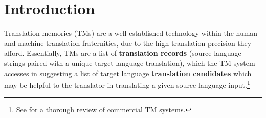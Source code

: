 


\newcommand{\ul}{}








\newcommand{\tabref}[1]{}
\newcommand{\secref}[1]{}

\newcommand{\gl}[1]{}
\newcommand{\skstring}[2]{}


\newcommand{\freq}{}
\newcommand{\len}{}
\newcommand{\Max}{}
\newcommand{\tf}{}
\newcommand{\idf}{}
\newcommand{\sweight}{}
\newcommand{\maxidf}{}
\newcommand{\maxlen}{}
\newcommand{\minlen}{}

\newcommand{\seg}{}
\newcommand{\maths}[1]{}
\newcommand{\vsub}[1]{}
\newcommand{\algnumb}[1]{}

\newcommand{\dslash}{}

\newenvironment{addframe}{}{}

\newcommand{\mathit}[1]{}










                                                                                   

\maketitle



    
    




\section{Introduction}
\label{sec:intro}

Translation memories (TMs) are a well-established technology within the
human and machine translation fraternities, due to the high translation
precision they afford. Essentially, TMs are a list of
{\bf translation records} (source language strings paired with a
unique target language translation), which the TM system accesses in
suggesting a list of target language {\bf translation candidates}
which may be helpful to the translator in translating a given source
language input.\footnote{See  for a thorough review of
  commercial TM systems.}


